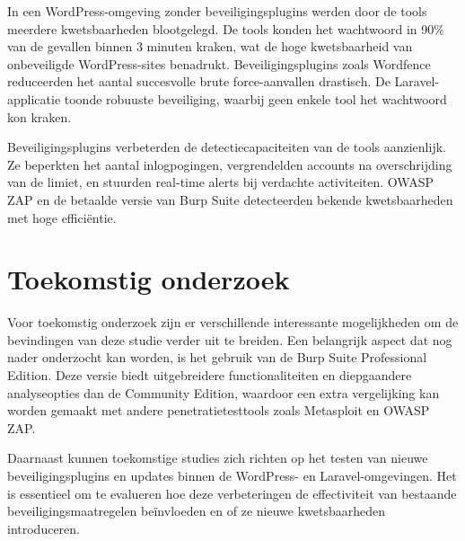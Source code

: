 \documentclass[a0,portrait]{hogent-poster}
\begin{document}
\begin{multicols}{2}
In een WordPress-omgeving zonder beveiligingsplugins werden door de tools meerdere kwetsbaarheden blootgelegd. De tools 
konden het wachtwoord in 90\% van de gevallen binnen 3 minuten kraken, wat de hoge kwetsbaarheid van onbeveiligde 
WordPress-sites benadrukt. Beveiligingsplugins zoals Wordfence reduceerden het aantal succesvolle brute force-aanvallen 
drastisch. De Laravel-applicatie toonde robuuste beveiliging, waarbij geen enkele tool het wachtwoord kon kraken.

Beveiligingsplugins verbeterden de detectiecapaciteiten van de tools aanzienlijk. Ze beperkten het aantal inlogpogingen, 
vergrendelden accounts na overschrijding van de limiet, en stuurden real-time alerts bij verdachte activiteiten. OWASP ZAP 
en de betaalde versie van Burp Suite detecteerden bekende kwetsbaarheden met hoge efficiëntie.

\section{Toekomstig onderzoek}

Voor toekomstig onderzoek zijn er verschillende interessante mogelijkheden om de bevindingen van deze studie verder uit te 
breiden. Een belangrijk aspect dat nog nader onderzocht kan worden, is het gebruik van de Burp Suite Professional Edition. 
Deze versie biedt uitgebreidere functionaliteiten en diepgaandere analyseopties dan de Community Edition, waardoor een extra 
vergelijking kan worden gemaakt met andere penetratietesttools zoals Metasploit en OWASP ZAP.

Daarnaast kunnen toekomstige studies zich richten op het testen van nieuwe beveiligingsplugins en updates binnen de 
WordPress- en Laravel-omgevingen. Het is essentieel om te evalueren hoe deze verbeteringen de effectiviteit van bestaande 
beveiligingsmaatregelen beïnvloeden en of ze nieuwe kwetsbaarheden introduceren.
\end{multicols}
\end{document}
